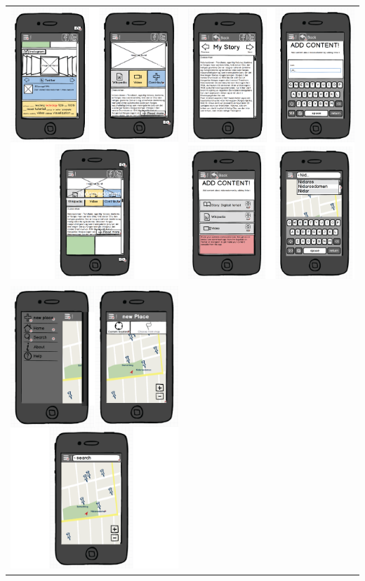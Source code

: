 \documentclass[12pt,a4paper,titlepage]{article}
\begin{document}
\begin{appendices}
\begin{center}
\begin{tabular}{cc}
	 	\includegraphics[width=0.35 \textwidth]{res/mockup1.png}	& 	
	 	\includegraphics[width=0.35 \textwidth]{res/mockup2.png}\\
	 	\includegraphics[width=0.35 \textwidth]{res/mockup3.png}	&
\\
\end{tabular}
\end{center}


\end{appendices}
\end{document}
